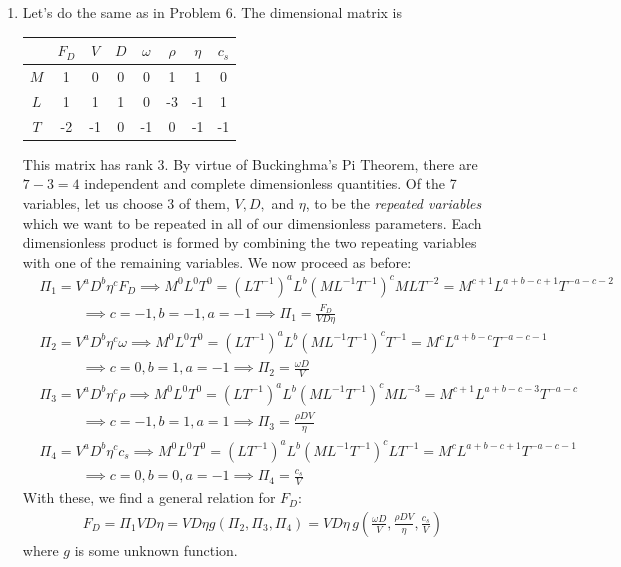 \documentclass{article}
\theoremstyle{definition}
\newcommand{\f}[2]{\frac{#1}{#2}}
\newcommand{\lp}{\left(}
\newcommand{\rp}{\right)}
\begin{document}
\begin{enumerate}[label=(\alph*)]
	\item Let's do the same as in Problem 6. The dimensional matrix is 
	\begin{center}
		\begin{tabular}{c|c c c c  c c c }
			    & $F_D$ & $V$ & $D$ & $\omega$ & $\rho$ & $\eta$ & $c_s$ \\
			\hline
			$M$ & 1     & 0   & 0   &  0       & 1      &  1     &  0  \\
			$L$ & 1     & 1   & 1   &  0       & -3     & -1     &  1  \\ 
			$T$ & -2    & -1  & 0   & -1       & 0      & -1     &  -1 \\  
		\end{tabular} 
	\end{center}

	This matrix has rank 3. By virtue of Buckinghma's Pi Theorem, there are $7-3 = 4$ independent and complete dimensionless quantities. Of the 7 variables, let us choose 3 of them, $V,D,$ and $\eta$, to be the \textit{repeated variables} which we want to be repeated in all of our dimensionless parameters. Each dimensionless product is formed by combining the two repeating variables with one of the remaining variables. We now proceed as before:
	\begin{align*}
	&\Pi_1 = V^a D^b \eta^c F_D \implies M^0 L^0 T^0 = (LT^{-1})^a L^b (ML^{-1}T^{-1})^c M L T^{-2} = M^{c+1}L^{a+b-c+1}T^{-a-c-2} \\
	&\quad\quad\quad\implies c = -1, b = -1, a=-1 \implies \boxed{\Pi_1 = \f{ F_D}{VD\eta}}\\
	&\Pi_2 = V^a D^b \eta^c \omega \implies M^0 L^0 T^0 = (LT^{-1})^a L^b (ML^{-1}T^{-1})^c T^{-1} = M^{c}L^{a+b-c}T^{-a-c-1} \\
	&\quad\quad\quad\implies c = 0 , b = 1, a=-1 \implies \boxed{\Pi_2 = \f{ \omega D}{V}}\\
	&\Pi_3 = V^a D^b \eta^c \rho \implies M^0 L^0 T^0 = (LT^{-1})^a L^b (ML^{-1}T^{-1})^c ML^{-3} = M^{c+1}L^{a+b-c-3}T^{-a-c} \\
	&\quad\quad\quad\implies c = -1 , b = 1, a = 1 \implies \boxed{\Pi_3 = \f{ \rho DV}{\eta}}\\
	&\Pi_4 = V^a D^b \eta^c c_s \implies M^0 L^0 T^0 = (LT^{-1})^a L^b (ML^{-1}T^{-1})^c L T^{-1} = M^{c}L^{a+b-c+1}T^{-a-c-1} \\
	&\quad\quad\quad\implies c = 0 , b = 0, a = -1 \implies \boxed{\Pi_4 = \f{ c_s}{V}}
	\end{align*}
	With these, we find a general relation for $F_D$:
	\begin{align*}
	F_D = \Pi_1 VD\eta = VD\eta g\lp \Pi_2, \Pi_3, \Pi_4 \rp = \boxed{VD\eta 
		\,g\lp \f{ \omega D}{V}, \f{ \rho DV}{\eta}, \f{ c_s}{V} \rp}
	\end{align*}
	where $g$ is some unknown function. \\
	

\end{enumerate}
\end{document}
